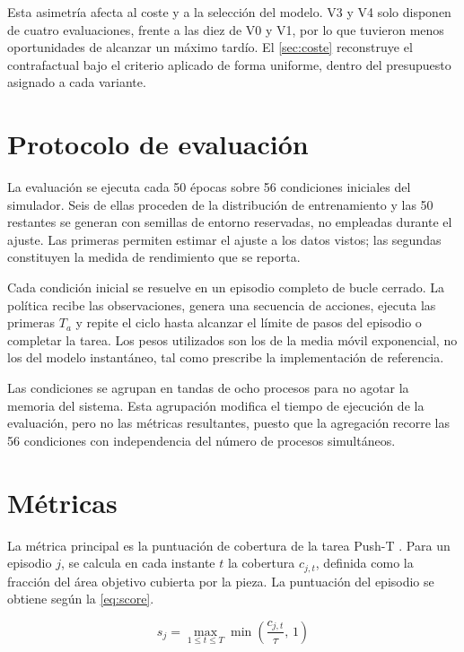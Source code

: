 Esta asimetr\'ia afecta al coste y a la selecci\'on del modelo. V3 y V4 solo disponen de
cuatro evaluaciones, frente a las diez de V0 y V1, por lo que tuvieron menos oportunidades
de alcanzar un m\'aximo tard\'io. El \cref{sec:coste} reconstruye el contrafactual bajo el
criterio aplicado de forma uniforme, dentro del presupuesto asignado a cada variante.

\section{Protocolo de evaluaci\'on}
\label{sec:evaluacion}

La evaluaci\'on se ejecuta cada \num{50} \'epocas sobre \num{56} condiciones iniciales del
simulador. Seis de ellas proceden de la distribuci\'on de entrenamiento y las \num{50}
restantes se generan con semillas de entorno reservadas, no empleadas durante el ajuste.
Las primeras permiten estimar el ajuste a los datos vistos; las segundas constituyen la
medida de rendimiento que se reporta.

Cada condici\'on inicial se resuelve en un episodio completo de bucle cerrado. La
pol\'itica recibe las observaciones, genera una secuencia de acciones, ejecuta las
primeras $T_a$ y repite el ciclo hasta alcanzar el l\'imite de pasos del episodio o
completar la tarea. Los pesos utilizados son los de la media m\'ovil exponencial, no los
del modelo instant\'aneo, tal como prescribe la implementaci\'on de referencia.

Las condiciones se agrupan en tandas de ocho procesos para no agotar la memoria del
sistema. Esta agrupaci\'on modifica el tiempo de ejecuci\'on de la evaluaci\'on, pero no las
m\'etricas resultantes, puesto que la agregaci\'on recorre las \num{56} condiciones con
independencia del n\'umero de procesos simult\'aneos.

\section{M\'etricas}
\label{sec:metricas}

La m\'etrica principal es la puntuaci\'on de cobertura de la tarea Push-T
\cite{chi2025diffusion}. Para un episodio $j$, se calcula en cada instante $t$ la
cobertura $c_{j,t}$, definida como la fracci\'on del \'area objetivo cubierta por la
pieza. La puntuaci\'on del episodio se obtiene seg\'un la \cref{eq:score}.

\begin{equation}
  s_j = \max_{1 \le t \le T} \min\!\left(\frac{c_{j,t}}{\tau},\, 1\right)
  \label{eq:score}
\end{equation}

